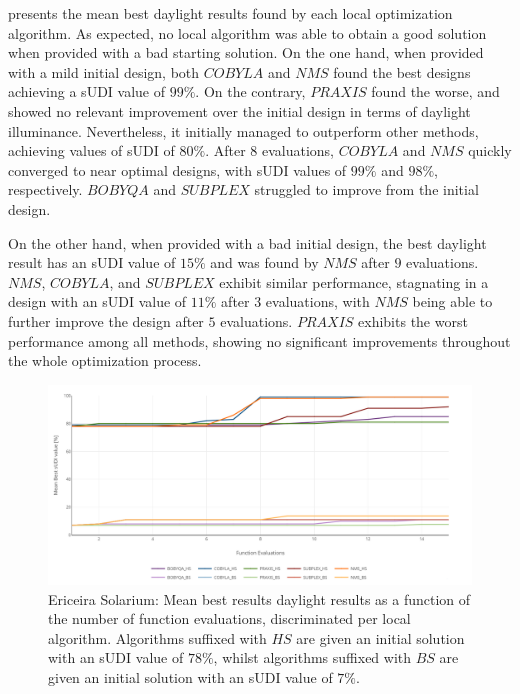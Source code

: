  presents the mean best daylight results found by each local optimization algorithm. As expected, no local algorithm was able to obtain a good solution when provided with a bad starting solution. On the one hand, when provided with a mild initial design, both $COBYLA$ and $NMS$ found the best designs achieving a \ac{sUDI} value of $99\%$. On the contrary, $PRAXIS$ found the worse, and showed no relevant improvement over the initial design in terms of daylight illuminance. Nevertheless, it initially managed to outperform other methods, achieving values of \ac{sUDI} of $80\%$. After $8$ evaluations, $COBYLA$ and $NMS$ quickly converged to near optimal designs, with \ac{sUDI} values of $99\%$ and $98\%$, respectively. $BOBYQA$ and $SUBPLEX$ struggled to improve from the initial design.

On the other hand, when provided with a bad initial design, the best daylight result has an \ac{sUDI} value of $15\%$ and was found by $NMS$ after $9$ evaluations. $NMS$, $COBYLA$, and $SUBPLEX$ exhibit similar performance, stagnating in a design with an \ac{sUDI} value of $11\%$ after $3$ evaluations, with $NMS$ being able to further improve the design after $5$ evaluations. $PRAXIS$ exhibits the worst performance among all methods, showing no significant improvements throughout the whole optimization process.

\begin{figure}[htbp]
	\centering
	\includegraphics[width=\textwidth]{Images/Evaluation/Ericeira_results_ph2.PNG}
	\caption[Ericeira Solarium: Mean best results of daylight performance in function of the number of evaluations, discriminated per local algorithm]{Ericeira Solarium: Mean best results daylight results as a function of the number of function evaluations, discriminated per local algorithm. Algorithms suffixed with $HS$ are given an initial solution with an \ac{sUDI} value of $78\%$, whilst algorithms suffixed with $BS$ are given an initial solution with an \ac{sUDI} value of $7\%$.}
	\label{fig:phase2results}
\end{figure}



